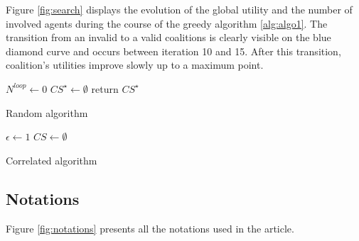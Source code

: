\documentclass[journal]{IEEEtran}
\begin{document}
Figure \ref{fig:search} displays the evolution of the global utility and the number of involved agents during the course of the greedy algorithm \ref{alg:algo1}. The transition from an invalid to a valid coalitions is clearly visible on the blue diamond curve and occurs between iteration 10 and 15. After this transition, coalition's utilities improve slowly up to a maximum point. 

\begin{algorithm}
 $ N^{loop} \leftarrow 0 $ \;
 $ CS^{\star} \leftarrow \emptyset $\;
  return $ CS^{\star} $
 \caption{Random algorithm}
 \label{alg:algo2}
\end{algorithm}

\begin{algorithm}
 $ \epsilon \leftarrow 1 $ \;
 $ CS \leftarrow \emptyset $\;
 \caption{Correlated algorithm}
\label{alg:algo3}
\end{algorithm}



 \subsection{Notations}

Figure \ref{fig:notations} presents all the notations used in the article.
 
\end{document}
